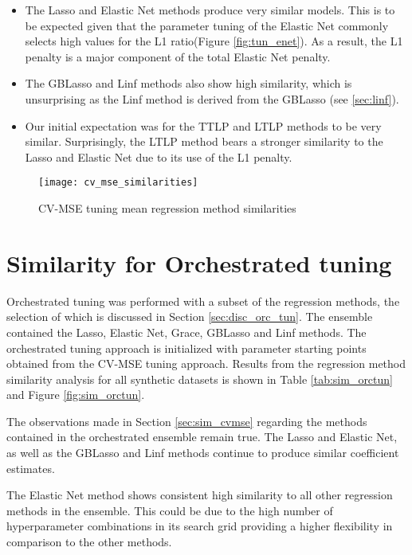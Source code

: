 \begin{itemize}
	\item The Lasso and Elastic Net methods produce very similar models. This is to be expected given that the parameter tuning of the Elastic Net commonly selects high values for the L1 ratio(Figure \ref{fig:tun_enet}). As a result, the L1 penalty is a major component of the total Elastic Net penalty.
	\item The GBLasso and Linf methods also show high similarity, which is unsurprising as the Linf method is derived from the GBLasso (see  \ref{sec:linf}).
	\item Our initial expectation was for the TTLP and LTLP methods to be very similar. Surprisingly, the LTLP method bears a stronger similarity to the Lasso and Elastic Net due to its use of the L1 penalty.
\end{itemize}



\begin{figure}[H]
	\centering
	\texttt{[image: cv\_mse\_similarities]}
	\caption{CV-MSE tuning mean regression method similarities}
	\label{fig:sim_cvmse}
\end{figure}


\section{Similarity for Orchestrated tuning} \label{sec:sim_orctun}
Orchestrated tuning was performed with a subset of the regression methods, the selection of which is discussed in Section \ref{sec:disc_orc_tun}. The ensemble contained the Lasso, Elastic Net, Grace, GBLasso and Linf methods. The orchestrated tuning approach is initialized with parameter starting points obtained from the CV-MSE tuning approach. Results from the regression method similarity analysis for all synthetic datasets is shown in Table \ref{tab:sim_orctun} and Figure \ref{fig:sim_orctun}. 

The observations made in Section \ref{sec:sim_cvmse} regarding the methods contained in the orchestrated ensemble remain true. The Lasso and Elastic Net, as well as the GBLasso and Linf methods continue to produce similar coefficient estimates. 

The Elastic Net method shows consistent high similarity to all other regression methods in the ensemble. This could be due to the high number of hyperparameter combinations in its search grid providing a higher flexibility in comparison to the other methods.

